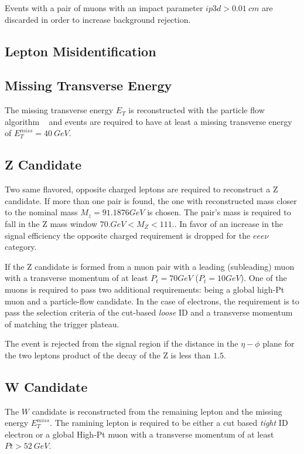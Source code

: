 Events with a pair of muons with an impact parameter $ip3d>0.01~cm$ are
discarded in order to increase background rejection.

\subsection{Lepton Misidentification}


\subsection{Missing Transverse Energy}

The missing transverse energy $E_T$ is reconstructed with the particle flow
algorithm ~\cite{particleflow} and events are required to have at least a
missing transverse energy of $E_T^{miss}=40~GeV$.

\subsection{Z Candidate}

Two same flavored, opposite charged leptons are required to reconstruct a Z
candidate. If more than one pair is found, the one with reconstructed mass
closer to the nominal mass $M_z= 91.1876 GeV$ is chosen. The pair's mass
is required to fall in the Z mass window $ 70. GeV < M_Z < 111.$. In favor of an
increase in the signal efficiency the opposite charged requirement is dropped
for the $eee\nu$ category.

If the Z candidate is formed from a muon pair with a leading (subleading) muon with
a transverse momentum of at least $P_t=70 GeV$ ($P_t=10GeV$). One of the
muons is required to pass two additional requirements: being a global high-Pt muon and a
particle-flow candidate. In the case of electrons, the requirement is to pass the
selection criteria of the cut-based \emph{loose} ID and a transverse momentum of
matching the trigger plateau.

The event is rejected from the signal region if the distance in the $\eta-\phi$
plane for the two leptons product of the decay of the Z is less than $1.5$.

\subsection{W Candidate}

The $W$ candidate is reconstructed from the remaining lepton and the missing energy
$E_T^{miss}$. The ramining lepton is required to be either a cut based \emph{tight}
ID electron or a global High-Pt muon with a transverse momentum
of at least $Pt>52~GeV$.

